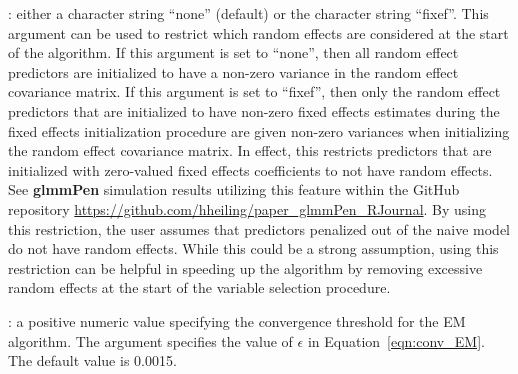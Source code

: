 : either a character string ``none'' (default) or the character string ``fixef''. This argument can be used to restrict which random effects are considered at the start of the algorithm. If this argument is set to ``none'', then all random effect predictors are initialized to have a non-zero variance in the random effect covariance matrix. If this argument is set to ``fixef'', then only the random effect predictors that are initialized to have non-zero fixed effects estimates during the fixed effects initialization procedure are given non-zero variances when initializing the random effect covariance matrix. In effect, this restricts predictors that are initialized with zero-valued fixed effects coefficients to not have random effects. See \textbf{glmmPen} simulation results utilizing this feature within the GitHub repository \url{https://github.com/hheiling/paper_glmmPen_RJournal}.
By using this restriction, the user assumes that predictors penalized out of the naive model do not have random effects. While this could be a strong assumption, using this restriction can be helpful in speeding up the algorithm by removing excessive random effects at the start of the variable selection procedure.

: a positive numeric value specifying the convergence
threshold for the EM algorithm. The argument  specifies
the value of \(\epsilon\) in Equation~\ref{eqn:conv_EM}. The default
value is 0.0015.


